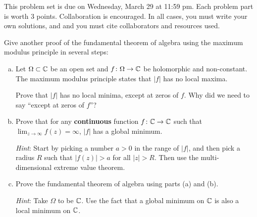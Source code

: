 \maketitle


This problem set is due on Wednesday, March 29 at 11:59 pm. Each problem part is worth 3 points. Collaboration is encouraged. In all cases, you must write your own solutions, and and you must cite collaborators and resources used.


\begin{problem}
  Give another proof of the fundamental theorem of algebra using the maximum modulus principle in several steps:
  \begin{enumerate}[(a)]
    \item Let $\Omega\subset\mathbb{C}$ be an open set and $f\colon\Omega\to\mathbb{C}$ be holomorphic and non-constant. The maximum modulus principle states that $|f|$ has no local maxima.
    
    Prove that $|f|$ has no local minima, except at zeros of $f$. Why did we need to say ``except at zeros of $f$''?
    \item Prove that for any \textbf{continuous} function $f\colon\mathbb{C}\to\mathbb{C}$ such that $\lim_{z\to\infty}f(z)=\infty$, $|f|$ has a global minimum.
    
    \emph{Hint}: Start by picking a number $a>0$ in the range of $|f|$, and then pick a radius $R$ such that $|f(z)|>a$ for all $|z|>R$. Then use the multi-dimensional extreme value theorem.
    \item Prove the fundamental theorem of algebra using parts (a) and (b).
    
    \emph{Hint}: Take $\Omega$ to be $\mathbb{C}$. Use the fact that a global minimum on $\mathbb{C}$ is also a local minimum on $\mathbb{C}$.
  \end{enumerate}
\end{problem}

